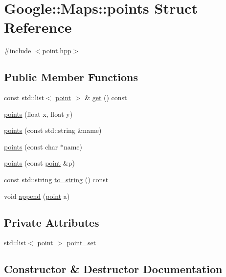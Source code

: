 \hypertarget{a00063}{}\section{Google\+:\+:Maps\+:\+:points Struct Reference}
\label{a00063}


{\ttfamily \#include $<$point.\+hpp$>$}

\subsection*{Public Member Functions}
\begin{DoxyCompactItemize}
\item 
const std\+::list$<$ \hyperlink{a00059}{point} $>$ \& \hyperlink{a00063_ade3824f6b14be94e13879c6a199feedc}{get} () const
\item 
\hyperlink{a00063_aa6fe71328e193ec7d73795733a242c8e}{points} (float x, float y)
\item 
\hyperlink{a00063_aea068cb11179bbb1ba6b1bbb0460fc07}{points} (const std\+::string \&name)
\item 
\hyperlink{a00063_a667223cf7d81616099a86abc28f165c6}{points} (const char $\ast$name)
\item 
\hyperlink{a00063_a76cef451acd0135c956398368c43f029}{points} (const \hyperlink{a00059}{point} \&p)
\item 
const std\+::string \hyperlink{a00063_a3e732652c10f7b3e6797ef4ecd7092f4}{to\+\_\+string} () const
\item 
void \hyperlink{a00063_a9c52ae880020f17d9d0bd68587a5ba51}{append} (\hyperlink{a00059}{point} a)
\end{DoxyCompactItemize}
\subsection*{Private Attributes}
\begin{DoxyCompactItemize}
\item 
std\+::list$<$ \hyperlink{a00059}{point} $>$ \hyperlink{a00063_affe83c1e22c96884077b33b98a3e7667}{point\+\_\+set}
\end{DoxyCompactItemize}


\subsection{Constructor \& Destructor Documentation}
\mbox{\label{a00063_aa6fe71328e193ec7d73795733a242c8e}} 
